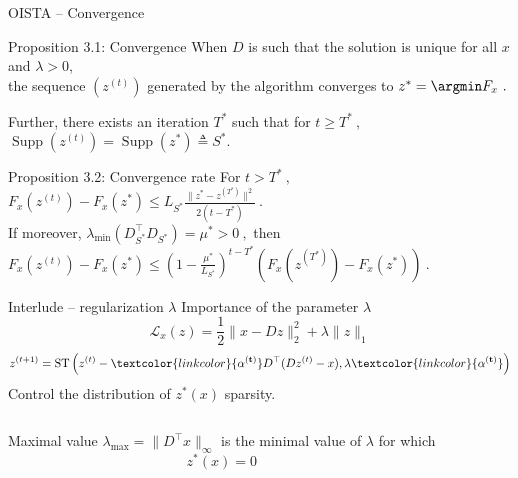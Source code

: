 \documentclass{beamer}
\DeclareMathOperator*{\supp}{Supp}
\begin{document}
\begin{frame}{OISTA -- Convergence}
    \begin{block}{Proposition 3.1: Convergence}
        When $D$ is such that the solution is unique for all $x$ and $\lambda >0$,\\
        the sequence $(z^{(t)})$ generated by the algorithm converges to $z^* =\argmin F_x~.$

        Further, there exists an iteration $T^*$ such that for $t\geq T^*~,$ $\supp(z^{(t)}) = \supp(z^*) \triangleq S^*$.
    \end{block}

    \begin{block}{Proposition 3.2: Convergence rate}
        For $t > T^*~,$\\
        {\centering
            $F_x(z^{(t)}) - F_x(z^*) \leq L_{S^*} \frac{\|z^{*} - z^{(T^*)}\|^2}{2(t - T^*)}~.$\\[1em]
        }
        If moreover, $\lambda_{\min}(D_{S^*}^\top D_{S^*}) = \mu^* > 0~,$ then\\[1em]
        {\centering
            $F_x(z^{(t)}) - F_x(z^*) \leq
                (1 - \tfrac{\mu^*}{L_{S^*}})^{t - T^*}(F_x(z^{(T^*)}) - F_x(z^*))~.$\\
        }
    \end{block}
\end{frame}


\begin{frame}[t]{Interlude -- regularization $\lambda$}
    Importance of the parameter $\lambda$
    \[
    \mathcal L_x(z) = \frac{1}{2}\|x - Dz\|_2^2 + \lambda \|z\|_1
    \]
   \[
   z^{(t+1)} = \text{ST}\left(z^{(t)}
   - \textcolor{linkcolor}{\bf\alpha^{(t)}} D^\top(D z^{(t)} -x),
   \lambda\textcolor{linkcolor}{\bf\alpha^{(t)}}\right)
   \]
   Control the distribution of $z^*(x)$ sparsity.\\[.5em]
\begin{columns}[c]
        \begin{block}{Maximal value}
            $\lambda_{\max} = \|D^\top x\|_\infty$ is the minimal value of $\lambda$ for which
            \[
                z^*(x) = 0
            \]
        \end{block}
\end{columns}




\end{frame}
\end{document}

